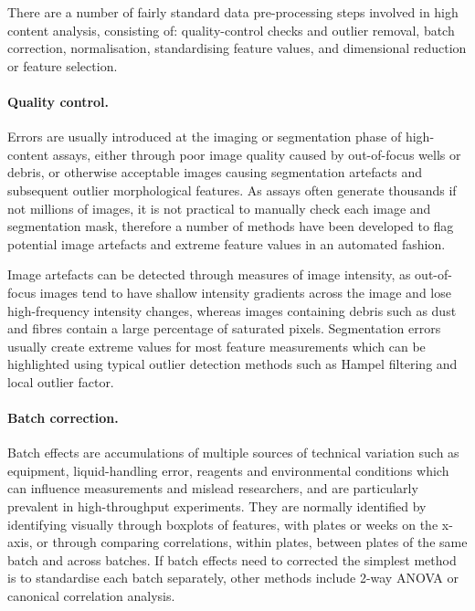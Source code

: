 \documentclass[a4paper,11pt,twoside,openright]{scrbook}
\begin{document}
There are a number of fairly standard data pre-processing steps involved in high content analysis, consisting of: quality-control checks and outlier removal, batch correction, normalisation, standardising feature values, and dimensional reduction or feature selection. \cite{Caicedo2017}


\paragraph{Quality control.}
Errors are usually introduced at the imaging or segmentation phase of high-content assays, either through poor image quality caused by out-of-focus wells or debris, or otherwise acceptable images causing segmentation artefacts and subsequent outlier morphological features.
As assays often generate thousands if not millions of images, it is not practical to manually check each image and segmentation mask, therefore a number of methods have been developed to flag potential image artefacts and extreme feature values in an automated fashion.

Image artefacts can be detected through measures of image intensity, as out-of-focus images tend to have shallow intensity gradients across the image and lose high-frequency intensity changes, \cite{Bray2012} whereas images containing debris such as dust and fibres contain a large percentage of saturated pixels.
Segmentation errors usually create extreme values for most feature measurements which can be highlighted using typical outlier detection methods such as Hampel filtering \cite{Hampel1974} and local outlier factor. \cite{Breunig2000}

\paragraph{Batch correction.}
Batch effects are accumulations of multiple sources of technical variation such as equipment, liquid-handling error, reagents and environmental conditions which can influence measurements and mislead researchers, and are particularly prevalent in high-throughput experiments.
They are normally identified by identifying visually through boxplots of features, with plates or weeks on the x-axis, or through comparing correlations, within plates, between plates of the same batch and across batches.
If batch effects need to corrected the simplest method is to standardise each batch separately, other methods include 2-way ANOVA \cite{Nygaard2016} or canonical correlation analysis. \cite{Vaisipour2014}
\end{document}
